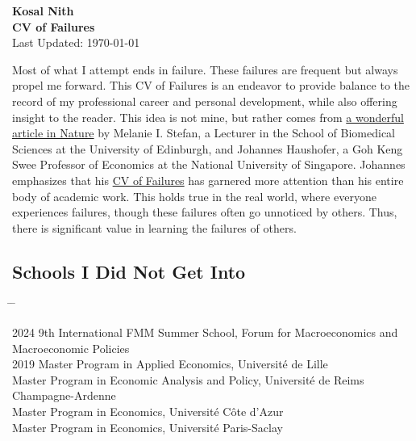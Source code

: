 \documentclass[10pt,a4paper]{article}
\newcommand{\tabbedblock}[1]{

	\begin{tabbing}
		\hspace{2cm} \= \hspace{4cm} \= \kill
		#1
	\end{tabbing}
}
\begin{document}

\begin{center}
	\Large{\textbf{Kosal Nith}}\\
	\large{\textbf{CV of Failures}\\
	\normalsize Last Updated:	\today}
\end{center}


Most of what I attempt ends in failure. These failures are frequent but always propel me forward. This CV of Failures is an endeavor to provide balance to the record of my professional career and personal development, while also offering insight to the reader. This idea is not mine, but rather comes from \href{https://www.nature.com/articles/nj7322-467a}{a wonderful article in Nature} by Melanie I. Stefan, a Lecturer in the School of Biomedical Sciences at the University of Edinburgh, and Johannes Haushofer, a Goh Keng Swee Professor of Economics at the National University of Singapore. Johannes emphasizes that his \href{http://johanneshaushofer.com/wp-content/uploads/2023/12/Johannes_Haushofer_CV_of_Failures.pdf}{CV of Failures} has garnered more attention than his entire body of academic work. This holds true in the real world, where everyone experiences failures, though these failures often go unnoticed by others. Thus, there is significant value in learning the failures of others.

\subsection*{Schools I Did Not Get Into}

	\tabbedblock{
	2024 \> 9th International FMM Summer School, Forum for Macroeconomics and Macroeconomic Policies \\ 
	
	2019 \> Master Program in Applied Economics, Université de Lille \\
			\> Master Program in Economic Analysis and Policy, Université de Reims Champagne-Ardenne \\
			\> Master Program in Economics, Université Côte d'Azur \\
			\> Master Program in Economics, Université Paris-Saclay
}
\end{document}
